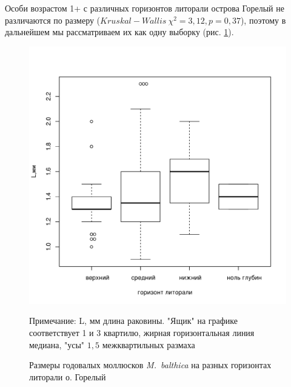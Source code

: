 \documentclass[12pt, a4paper]{disser}
\begin{document}
Особи возрастом 1+ с различных горизонтов литорали острова Горелый не различаются по размеру ($Kruskal-Wallis\ \chi^2 = 3,12, p = 0,37$), поэтому в дальнейшем мы рассматриваем их как одну выборку (рис. \ref{ris:Goreliy_length1+_gorizonty}).
	\begin{figure}
		\includegraphics{../White_Sea/growth_young/boxplot_Goreliy_length_1+_tidal.pdf}
	\caption{Размеры  годовалых моллюсков {\it M.~balthica} на разных горизонтах литорали о. Горелый}
	\label{ris:Goreliy_length1+_gorizonty}
	{\footnotesize Примечание: L, мм \textemdash длина раковины. "Ящик" на графике соответствует 1 и 3 квартилю, жирная горизонтальная линия \textemdash 		медиана, "усы" \textemdash $1,5$ межквартильных размаха}
	\end{figure}
\end{document}
